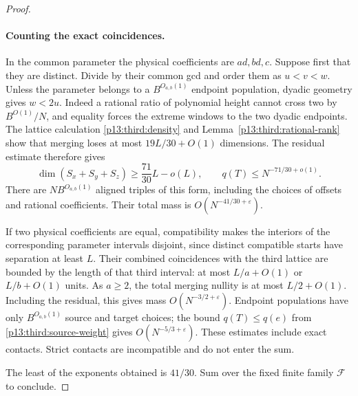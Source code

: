 \begin{proof}
\paragraph{Counting the exact coincidences.}
In the common parameter the physical coefficients are $ad,bd,c$.
Suppose first that they are distinct.  Divide by their common gcd
and order them as $u<v<w$.  Unless the parameter belongs to a
$B^{O_{a,b}(1)}$ endpoint population, dyadic geometry gives $w<2u$.
Indeed a rational ratio of polynomial height cannot cross two by
$B^{O(1)}/N$, and equality forces the extreme windows to the two
dyadic endpoints.
The lattice calculation \eqref{p13:third:density} and
Lemma~\ref{p13:third:rational-rank} show that merging loses at most
$19L/30+O(1)$ dimensions.  The residual estimate therefore gives
\[
 \dim(S_x+S_y+S_z)\geq\frac{71}{30}L-o(L),\qquad
 q(T)\leq N^{-71/30+o(1)}.
\]
There are $NB^{O_{a,b}(1)}$ aligned triples of this form, including the
choices of offsets and rational coefficients.  Their total mass is
$O(N^{-41/30+\varepsilon})$.

If two physical coefficients are equal, compatibility makes the
interiors of the corresponding parameter intervals disjoint, since
distinct compatible starts have separation at least $L$.
Their combined coincidences with the third lattice are bounded by the
length of that third interval: at most $L/a+O(1)$ or $L/b+O(1)$ units.
As $a\geq2$, the total merging nullity is at most $L/2+O(1)$.
Including the residual, this gives mass $O(N^{-3/2+\varepsilon})$.
Endpoint populations have only $B^{O_{a,b}(1)}$ source and target
choices; the bound $q(T)\leq q(e)$ from
\eqref{p13:third:source-weight} gives $O(N^{-5/3+\varepsilon})$.
These estimates include exact contacts.  Strict contacts are incompatible
and do not enter the sum.

The least of the exponents obtained is $41/30$.  Sum over the fixed
finite family $\mathcal F$ to conclude.
\end{proof}

